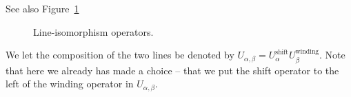 \documentclass[
  letterpaper,
  DIV=11,
  numbers=noendperiod]{scrreport}
\begin{document}
See also Figure~\ref{fig-line-isom}

\begin{figure}

\begin{minipage}[t]{0.50\linewidth}

{\centering 


}

\end{minipage}%
%
\begin{minipage}[t]{0.50\linewidth}

{\centering 


}

\end{minipage}%

\caption{\label{fig-line-isom}Line-isomorphism operators.}

\end{figure}

We let the composition of the two lines be denoted by
\(U_{\alpha,\beta} = U^\text{shift}_\alpha U^\text{winding}_\beta\).
Note that here we already has made a choice -- that we put the shift
operator to the left of the winding operator in \(U_{\alpha,\beta}\).
\end{document}
